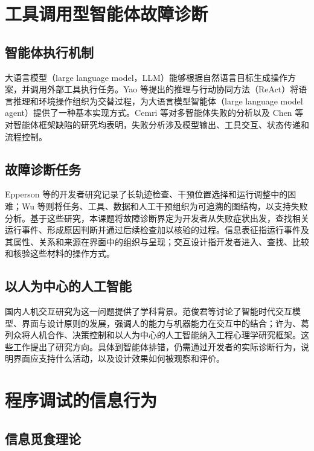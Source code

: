 \label{chap:literature-review}

\section{工具调用型智能体故障诊断}

\subsection{智能体执行机制}

大语言模型（large language model，LLM）能够根据自然语言目标生成操作方案，并调用外部工具执行任务。Yao 等\cite{yao2023react}提出的推理与行动协同方法（ReAct）将语言推理和环境操作组织为交替过程，为大语言模型智能体（large language model agent）提供了一种基本实现方式。Cemri 等\cite{cemri2025mast}对多智能体失败的分析以及 Chen 等\cite{ref20}对智能体框架缺陷的研究均表明，失败分析涉及模型输出、工具交互、状态传递和流程控制。

\subsection{故障诊断任务}

Epperson 等\cite{ref02}的开发者研究记录了长轨迹检查、干预位置选择和运行调整中的困难；Wu 等\cite{ref23}则将任务、工具、数据和人工干预组织为可追溯的图结构，以支持失败分析。基于这些研究，本课题将故障诊断界定为开发者从失败症状出发，查找相关运行事件、形成原因判断并通过后续检查加以核验的过程。信息表征指运行事件及其属性、关系和来源在界面中的组织与呈现；交互设计指开发者进入、查找、比较和核验这些材料的操作方式。

\subsection{以人为中心的人工智能}

国内人机交互研究为这一问题提供了学科背景。范俊君等\cite{ref42}讨论了智能时代交互模型、界面与设计原则的发展，强调人的能力与机器能力在交互中的结合；许为、葛列众\cite{ref63}将人机合作、决策控制和以人为中心的人工智能纳入工程心理学研究框架。这些工作提出了研究方向。具体到智能体排错，仍需通过开发者的实际诊断行为，说明界面应支持什么活动，以及设计效果如何被观察和评价。

\section{程序调试的信息行为}

\subsection{信息觅食理论}

